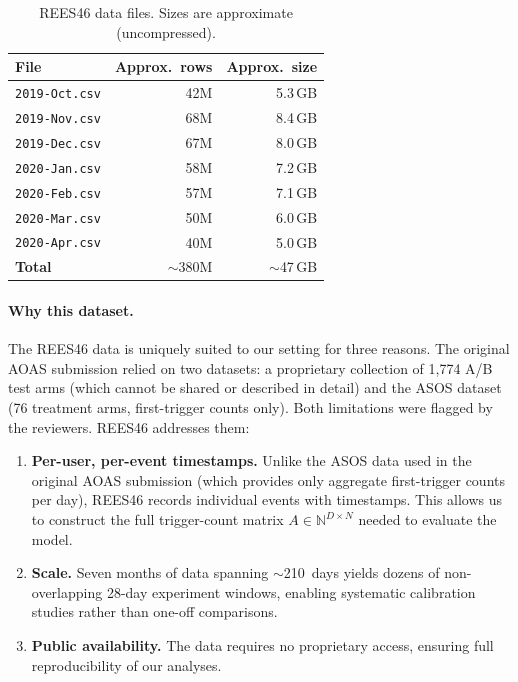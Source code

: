 \begin{table}[H]
\centering
\caption{REES46 data files. Sizes are approximate (uncompressed).}
\label{tab:rees46_files}
\small
\begin{tabular}{lrr}
\toprule
\textbf{File} & \textbf{Approx.\ rows} & \textbf{Approx.\ size} \\
\midrule
\texttt{2019-Oct.csv} & 42M & 5.3\,GB \\
\texttt{2019-Nov.csv} & 68M & 8.4\,GB \\
\texttt{2019-Dec.csv} & 67M & 8.0\,GB \\
\texttt{2020-Jan.csv} & 58M & 7.2\,GB \\
\texttt{2020-Feb.csv} & 57M & 7.1\,GB \\
\texttt{2020-Mar.csv} & 50M & 6.0\,GB \\
\texttt{2020-Apr.csv} & 40M & 5.0\,GB \\
\midrule
\textbf{Total} & $\sim$380M & $\sim$47\,GB \\
\bottomrule
\end{tabular}
\end{table}

\paragraph{Why this dataset.}
The REES46 data is uniquely suited to our setting for three reasons.
The original AOAS submission relied on two datasets: a proprietary
collection of 1,774 A/B test arms (which cannot be shared or described
in detail) and the ASOS dataset (76 treatment arms, first-trigger
counts only).
Both limitations were flagged by the reviewers.
REES46 addresses them:
\begin{enumerate}[leftmargin=*]
  \item \textbf{Per-user, per-event timestamps.}
        Unlike the ASOS data used in the original AOAS submission
        (which provides only aggregate first-trigger counts per day),
        REES46 records individual events with timestamps.
        This allows us to construct the full trigger-count matrix
        $A \in \mathbb{N}^{D \times N}$ needed to evaluate the
        \nbmodel{} model.
  \item \textbf{Scale.}
        Seven months of data spanning $\sim$210~days yields
        dozens of non-overlapping 28-day experiment windows,
        enabling systematic calibration studies rather than
        one-off comparisons.
  \item \textbf{Public availability.}
        The data requires no proprietary access, ensuring
        full reproducibility of our analyses.
\end{enumerate}

